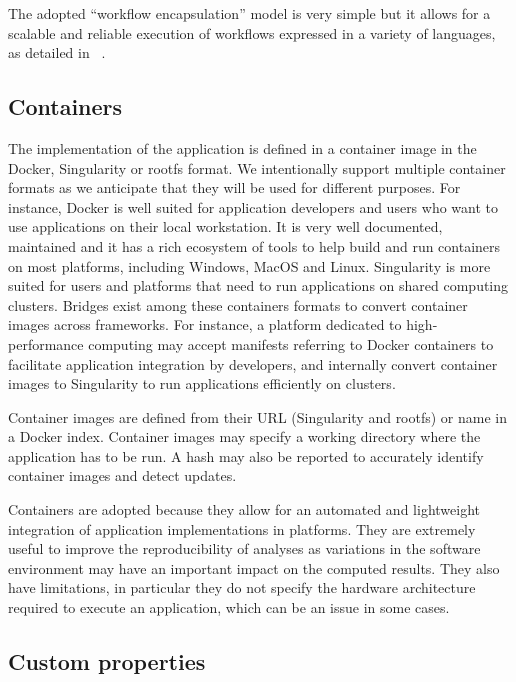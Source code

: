 \documentclass{article}
\begin{document}
The adopted ``workflow encapsulation'' model is very simple but it
allows for a scalable and reliable execution of workflows expressed in
a variety of languages, as detailed in ~\cite{glatard2016fgcs}.

\subsection{Containers}

The implementation of the application is defined in a container image
in the Docker, Singularity or rootfs format. We intentionally support
multiple container formats as we anticipate that they will be used for
different purposes. For instance, Docker is well suited for
application developers and users who want to use applications on their
local workstation. It is very well documented, maintained and it has a
rich ecosystem of tools to help build and run containers on most
platforms, including Windows, MacOS and Linux. Singularity is more
suited for users and platforms that need to run applications on shared
computing clusters. Bridges exist among these containers formats to
convert container images across frameworks. For instance, a platform
dedicated to high-performance computing may accept manifests referring
to Docker containers to facilitate application integration by
developers, and internally convert container images to Singularity to
run applications efficiently on clusters.

Container images are defined from their URL (Singularity and rootfs)
or name in a Docker index. Container images may specify a working
directory where the application has to be run. A hash may also be
reported to accurately identify container images and detect updates.

Containers are adopted because they allow for an automated and
lightweight integration of application implementations in
platforms. They are extremely useful to improve the reproducibility of
analyses as variations in the software environment may have an
important impact on the computed results. They also have limitations,
in particular they do not specify the hardware architecture required
to execute an application, which can be an issue in some cases.

\subsection{Custom properties}
\end{document}
